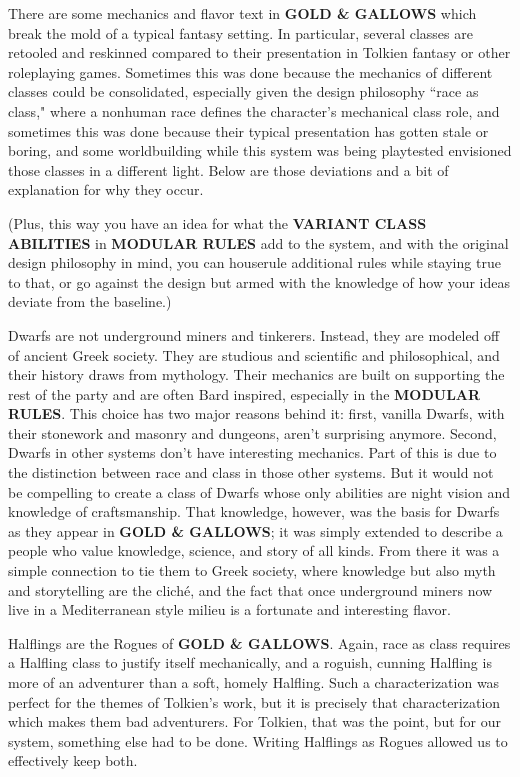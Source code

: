 \documentclass[twoside]{article}
\begin{document}
There are some mechanics and flavor text in \textbf{GOLD \& GALLOWS} which break the mold of a typical fantasy setting. In particular, several classes are retooled and reskinned compared to their presentation in Tolkien fantasy or other roleplaying games. Sometimes this was done because the mechanics of different classes could be consolidated, especially given the design philosophy ``race as class," where a nonhuman race defines the character's mechanical class role, and sometimes this was done because their typical presentation has gotten stale or boring, and some worldbuilding while this system was being playtested envisioned those classes in a different light. Below are those deviations and a bit of explanation for why they occur.

\bigbreak

(Plus, this way you have an idea for what the \textbf{VARIANT CLASS ABILITIES} in \textbf{MODULAR RULES} add to the system, and with the original design philosophy in mind, you can houserule additional rules while staying true to that, or go against the design but armed with the knowledge of how your ideas deviate from the baseline.)

\bigbreak

Dwarfs are not underground miners and tinkerers. Instead, they are modeled off of ancient Greek society. They are studious and scientific and philosophical, and their history draws from mythology. Their mechanics are built on supporting the rest of the party and are often Bard inspired, especially in the \textbf{MODULAR RULES}. This choice has two major reasons behind it: first, vanilla Dwarfs, with their stonework and masonry and dungeons, aren't surprising anymore. Second, Dwarfs in other systems don't have interesting mechanics. Part of this is due to the distinction between race and class in those other systems. But it would not be compelling to create a class of Dwarfs whose only abilities are night vision and knowledge of craftsmanship. That knowledge, however, was the basis for Dwarfs as they appear in \textbf{GOLD \& GALLOWS}; it was simply extended to describe a people who value knowledge, science, and story of all kinds. From there it was a simple connection to tie them to Greek society, where knowledge but also myth and storytelling are the clich\'e, and the fact that once underground miners now live in a Mediterranean style milieu is a fortunate and interesting flavor.

\bigbreak

Halflings are the Rogues of \textbf{GOLD \& GALLOWS}. Again, race as class requires a Halfling class to justify itself mechanically, and a roguish, cunning Halfling is more of an adventurer than a soft, homely Halfling. Such a characterization was perfect for the themes of Tolkien's work, but it is precisely that characterization which makes them bad adventurers. For Tolkien, that was the point, but for our system, something else had to be done. Writing Halflings as Rogues allowed us to effectively keep both.
\end{document}
